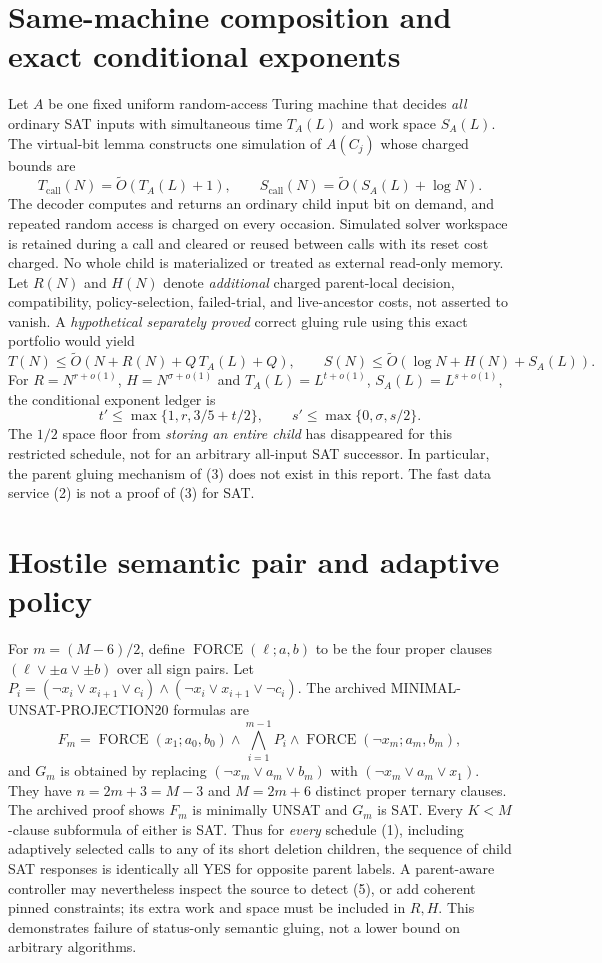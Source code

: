 \documentclass[11pt]{article}
\begin{document}
\section{Same-machine composition and exact conditional exponents}
Let $A$ be one fixed uniform random-access Turing machine that
decides \emph{all} ordinary SAT inputs with simultaneous time
$T_A(L)$ and work space $S_A(L)$.
The virtual-bit lemma constructs one simulation of $A(C_j)$
whose charged bounds are
\[
T_{\mathrm{call}}(N)=\widetilde O(T_A(L)+1),\qquad
S_{\mathrm{call}}(N)=\widetilde O(S_A(L)+\log N).
\tag{2}
\]
The decoder computes and returns an ordinary child input bit on
demand, and repeated random access is charged on every occasion.
Simulated solver workspace is retained during a call and cleared
or reused between calls with its reset cost charged. No whole
child is materialized or treated as external read-only memory.
Let $R(N)$ and $H(N)$ denote \emph{additional} charged
parent-local decision, compatibility, policy-selection, failed-trial,
and live-ancestor costs, not asserted to vanish.
A \emph{hypothetical separately proved} correct gluing rule
using this exact portfolio would yield
\[
T(N)\le\widetilde O\!\left(N+R(N)+Q\,T_A(L)+Q\right),\qquad
S(N)\le\widetilde O\!\left(\log N+H(N)+S_A(L)\right).
\tag{3}
\]
For $R=N^{r+o(1)}$, $H=N^{\sigma+o(1)}$ and
$T_A(L)=L^{t+o(1)}$, $S_A(L)=L^{s+o(1)}$,
the conditional exponent ledger is
\[
t'\le\max\{1,r,3/5+t/2\},\qquad
s'\le\max\{0,\sigma,s/2\}.
\tag{4}
\]
The $1/2$ space floor from \emph{storing an entire child}
has disappeared for this restricted schedule, not for an
arbitrary all-input SAT successor. In particular, the parent
gluing mechanism of (3) does not exist in this report.
The fast data service (2) is not a proof of (3) for SAT.

\section{Hostile semantic pair and adaptive policy}
For $m=(M-6)/2$, define
$\operatorname{FORCE}(\ell;a,b)$ to be the four proper
clauses $(\ell\lor\pm a\lor\pm b)$ over all sign pairs.
Let $P_i=(\neg x_i\lor x_{i+1}\lor c_i)
\land(\neg x_i\lor x_{i+1}\lor\neg c_i)$.
The archived MINIMAL-UNSAT-PROJECTION20 formulas are
\[
F_m=\operatorname{FORCE}(x_1;a_0,b_0)\land
\bigwedge_{i=1}^{m-1}P_i\land
\operatorname{FORCE}(\neg x_m;a_m,b_m),
\tag{5}
\]
and $G_m$ is obtained by replacing
$(\neg x_m\lor a_m\lor b_m)$ with
$(\neg x_m\lor a_m\lor x_1)$.
They have $n=2m+3=M-3$ and $M=2m+6$
distinct proper ternary clauses.
The archived proof shows $F_m$ is minimally UNSAT and
$G_m$ is SAT. Every $K<M$-clause subformula of either is SAT.
Thus for \emph{every} schedule (1), including adaptively
selected calls to any of its short deletion children,
the sequence of child SAT responses is identically all YES
for opposite parent labels.
A parent-aware controller may nevertheless inspect the source
to detect (5), or add coherent pinned constraints; its extra
work and space must be included in $R,H$.
This demonstrates failure of status-only semantic gluing,
not a lower bound on arbitrary algorithms.
\end{document}
